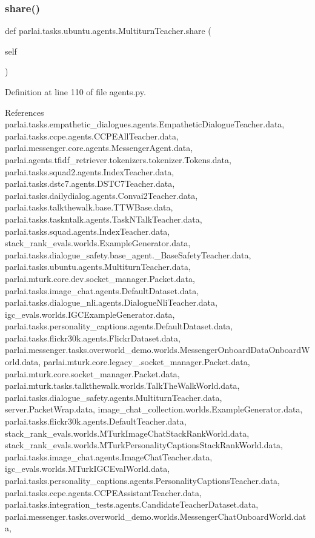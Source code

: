 \subsubsection{\texorpdfstring{share()}{share()}}
{\footnotesize\ttfamily def parlai.\+tasks.\+ubuntu.\+agents.\+Multiturn\+Teacher.\+share (\begin{DoxyParamCaption}\item[{}]{self }\end{DoxyParamCaption})}



Definition at line 110 of file agents.\+py.



References parlai.\+tasks.\+empathetic\+\_\+dialogues.\+agents.\+Empathetic\+Dialogue\+Teacher.\+data, parlai.\+tasks.\+ccpe.\+agents.\+C\+C\+P\+E\+All\+Teacher.\+data, parlai.\+messenger.\+core.\+agents.\+Messenger\+Agent.\+data, parlai.\+agents.\+tfidf\+\_\+retriever.\+tokenizers.\+tokenizer.\+Tokens.\+data, parlai.\+tasks.\+squad2.\+agents.\+Index\+Teacher.\+data, parlai.\+tasks.\+dstc7.\+agents.\+D\+S\+T\+C7\+Teacher.\+data, parlai.\+tasks.\+dailydialog.\+agents.\+Convai2\+Teacher.\+data, parlai.\+tasks.\+talkthewalk.\+base.\+T\+T\+W\+Base.\+data, parlai.\+tasks.\+taskntalk.\+agents.\+Task\+N\+Talk\+Teacher.\+data, parlai.\+tasks.\+squad.\+agents.\+Index\+Teacher.\+data, stack\+\_\+rank\+\_\+evals.\+worlds.\+Example\+Generator.\+data, parlai.\+tasks.\+dialogue\+\_\+safety.\+base\+\_\+agent.\+\_\+\+Base\+Safety\+Teacher.\+data, parlai.\+tasks.\+ubuntu.\+agents.\+Multiturn\+Teacher.\+data, parlai.\+mturk.\+core.\+dev.\+socket\+\_\+manager.\+Packet.\+data, parlai.\+tasks.\+image\+\_\+chat.\+agents.\+Default\+Dataset.\+data, parlai.\+tasks.\+dialogue\+\_\+nli.\+agents.\+Dialogue\+Nli\+Teacher.\+data, igc\+\_\+evals.\+worlds.\+I\+G\+C\+Example\+Generator.\+data, parlai.\+tasks.\+personality\+\_\+captions.\+agents.\+Default\+Dataset.\+data, parlai.\+tasks.\+flickr30k.\+agents.\+Flickr\+Dataset.\+data, parlai.\+messenger.\+tasks.\+overworld\+\_\+demo.\+worlds.\+Messenger\+Onboard\+Data\+Onboard\+World.\+data, parlai.\+mturk.\+core.\+legacy\+\_.\+socket\+\_\+manager.\+Packet.\+data, parlai.\+mturk.\+core.\+socket\+\_\+manager.\+Packet.\+data, parlai.\+mturk.\+tasks.\+talkthewalk.\+worlds.\+Talk\+The\+Walk\+World.\+data, parlai.\+tasks.\+dialogue\+\_\+safety.\+agents.\+Multiturn\+Teacher.\+data, server.\+Packet\+Wrap.\+data, image\+\_\+chat\+\_\+collection.\+worlds.\+Example\+Generator.\+data, parlai.\+tasks.\+flickr30k.\+agents.\+Default\+Teacher.\+data, stack\+\_\+rank\+\_\+evals.\+worlds.\+M\+Turk\+Image\+Chat\+Stack\+Rank\+World.\+data, stack\+\_\+rank\+\_\+evals.\+worlds.\+M\+Turk\+Personality\+Captions\+Stack\+Rank\+World.\+data, parlai.\+tasks.\+image\+\_\+chat.\+agents.\+Image\+Chat\+Teacher.\+data, igc\+\_\+evals.\+worlds.\+M\+Turk\+I\+G\+C\+Eval\+World.\+data, parlai.\+tasks.\+personality\+\_\+captions.\+agents.\+Personality\+Captions\+Teacher.\+data, parlai.\+tasks.\+ccpe.\+agents.\+C\+C\+P\+E\+Assistant\+Teacher.\+data, parlai.\+tasks.\+integration\+\_\+tests.\+agents.\+Candidate\+Teacher\+Dataset.\+data, parlai.\+messenger.\+tasks.\+overworld\+\_\+demo.\+worlds.\+Messenger\+Chat\+Onboard\+World.\+data, 